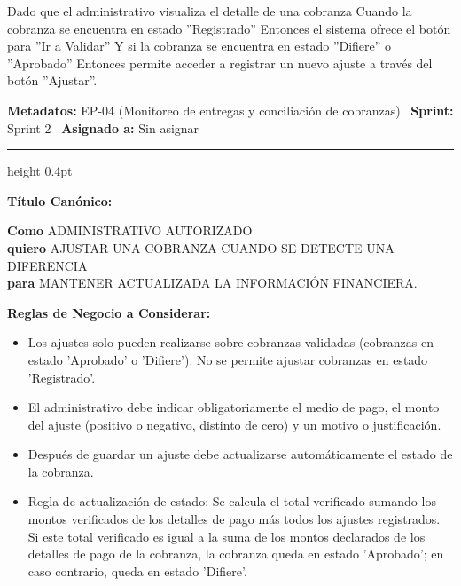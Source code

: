 \documentclass[a4paper,9pt]{article}
\begin{document}
\begin{tcolorbox}[hucard, title={\textbf{HU-50: VER DETALLE DE COBRANZA} \hfill \scriptsize \colorbox{bluestatus}{\textbf{\ New\ }} \quad \colorbox{white}{\textcolor{primarydark}{\textbf{\ 2 pts\ }}}}]
{Dado que el administrativo visualiza el detalle de una cobranza Cuando la cobranza se encuentra en estado ''Registrado'' Entonces el sistema ofrece el botón para ''Ir a Validar'' Y si la cobranza se encuentra en estado ''Difiere'' o ''Aprobado'' Entonces permite acceder a registrar un nuevo ajuste a través del botón ''Ajustar''.\par\vspace{2.5pt}
}\par
\end{tcolorbox}

\begin{tcolorbox}[hucard, title={\textbf{HU-58: AJUSTAR COBRANZA} \hfill \scriptsize \colorbox{bluestatus}{\textbf{\ New\ }} \quad \colorbox{white}{\textcolor{primarydark}{\textbf{\ 5 pts\ }}}}]
\vspace{-1pt}
\noindent\textbf{\footnotesize Metadatos:} EP-04 (Monitoreo de entregas y conciliación de cobranzas) \textbar\ \textbf{Sprint:} Sprint 2 \textbar\ \textbf{Asignado a:} Sin asignar\par\vspace{2pt}
\hrule height 0.4pt\par\vspace{3pt}
\noindent\textbf{\footnotesize Título Canónico:}\par\vspace{1pt}
{\small \textbf{Como} ADMINISTRATIVO AUTORIZADO \\ \textbf{quiero} AJUSTAR UNA COBRANZA CUANDO SE DETECTE UNA DIFERENCIA \\ \textbf{para} MANTENER ACTUALIZADA LA INFORMACIÓN FINANCIERA.}\par\vspace{3pt}
\noindent\textbf{\footnotesize Reglas de Negocio a Considerar:}\par\vspace{1pt}
{\footnotesize
\begin{itemize}[leftmargin=12pt, nosep, itemsep=1.5pt, topsep=1pt]
\item Los ajustes solo pueden realizarse sobre cobranzas validadas (cobranzas en estado 'Aprobado' o 'Difiere'). No se permite ajustar cobranzas en estado 'Registrado'.
\item El administrativo debe indicar obligatoriamente el medio de pago, el monto del ajuste (positivo o negativo, distinto de cero) y un motivo o justificación.
\item Después de guardar un ajuste debe actualizarse automáticamente el estado de la cobranza.
\item Regla de actualización de estado: Se calcula el total verificado sumando los montos verificados de los detalles de pago más todos los ajustes registrados. Si este total verificado es igual a la suma de los montos declarados de los detalles de pago de la cobranza, la cobranza queda en estado 'Aprobado'; en caso contrario, queda en estado 'Difiere'.

\end{itemize}}
\end{tcolorbox}
\end{document}
